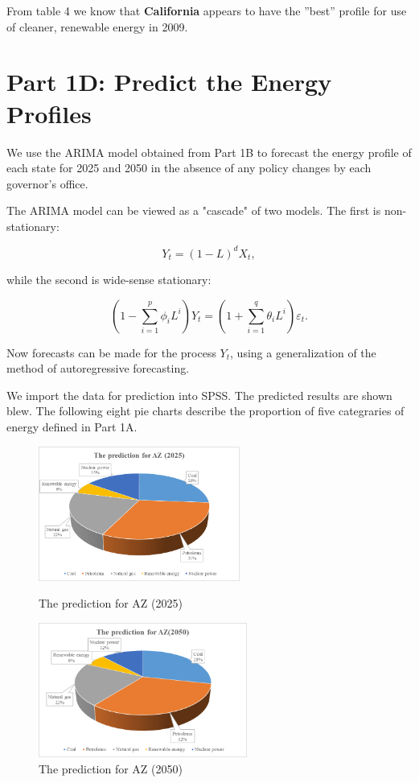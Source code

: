 \documentclass{mcmthesis}
\begin{document}
From table 4 we know that {\bf{California}} appears to have the ''best'' profile for use of cleaner, renewable energy in 2009.

\section{Part 1D: Predict the Energy Profiles}

We use the ARIMA model obtained from Part 1B to forecast the energy profile of each state for 2025 and 2050 in the absence of any policy changes by each governor's
office.

The ARIMA model can be viewed as a "cascade" of two models. The first is non-stationary\cite{Lai2002Group}:

\begin{equation}\label{26}
{ Y_{t}=(1-L)^{d}X_{t},}
 \end{equation}
 
while the second is wide-sense stationary:

\begin{equation}\label{27}
{\left(1-\sum _{i=1}^{p}\phi _{i}L^{i}\right)Y_{t}=\left(1+\sum _{i=1}^{q}\theta _{i}L^{i}\right)\varepsilon _{t}.}
\end{equation}

Now forecasts can be made for the process $Y_{t}$, using a generalization of the method of autoregressive forecasting.

We import the data for prediction into SPSS. The predicted results are shown blew. The following eight pie charts describe the proportion of five categraries of energy defined in Part 1A.

\begin{figure}
\begin{minipage}[t]{0.5\linewidth}
\centering
\includegraphics[width=2.6in]{./picturec/AZF2025.png}
\caption{The prediction for AZ (2025)}
\label{fig:left:15}
\end{minipage}%
\begin{minipage}[t]{0.5\linewidth}
\centering
\includegraphics[width=2.7in]{./picturec/AZF2050.png}
\caption{The prediction for AZ (2050)}
\label{fig:right:16}
\end{minipage}
\end{figure}
\end{document}
